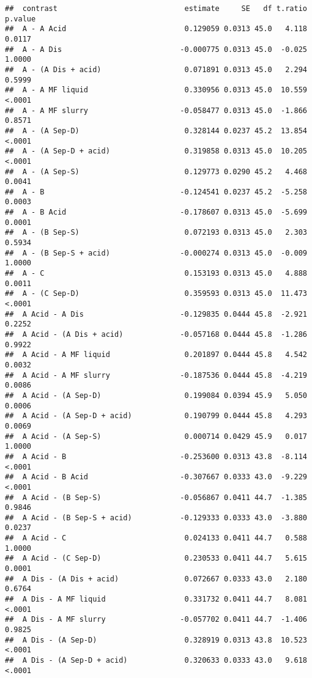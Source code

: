 \documentclass[
]{article}
\begin{document}
\begin{verbatim}
##  contrast                             estimate     SE   df t.ratio p.value
##  A - A Acid                           0.129059 0.0313 45.0   4.118  0.0117
##  A - A Dis                           -0.000775 0.0313 45.0  -0.025  1.0000
##  A - (A Dis + acid)                   0.071891 0.0313 45.0   2.294  0.5999
##  A - A MF liquid                      0.330956 0.0313 45.0  10.559  <.0001
##  A - A MF slurry                     -0.058477 0.0313 45.0  -1.866  0.8571
##  A - (A Sep-D)                        0.328144 0.0237 45.2  13.854  <.0001
##  A - (A Sep-D + acid)                 0.319858 0.0313 45.0  10.205  <.0001
##  A - (A Sep-S)                        0.129773 0.0290 45.2   4.468  0.0041
##  A - B                               -0.124541 0.0237 45.2  -5.258  0.0003
##  A - B Acid                          -0.178607 0.0313 45.0  -5.699  0.0001
##  A - (B Sep-S)                        0.072193 0.0313 45.0   2.303  0.5934
##  A - (B Sep-S + acid)                -0.000274 0.0313 45.0  -0.009  1.0000
##  A - C                                0.153193 0.0313 45.0   4.888  0.0011
##  A - (C Sep-D)                        0.359593 0.0313 45.0  11.473  <.0001
##  A Acid - A Dis                      -0.129835 0.0444 45.8  -2.921  0.2252
##  A Acid - (A Dis + acid)             -0.057168 0.0444 45.8  -1.286  0.9922
##  A Acid - A MF liquid                 0.201897 0.0444 45.8   4.542  0.0032
##  A Acid - A MF slurry                -0.187536 0.0444 45.8  -4.219  0.0086
##  A Acid - (A Sep-D)                   0.199084 0.0394 45.9   5.050  0.0006
##  A Acid - (A Sep-D + acid)            0.190799 0.0444 45.8   4.293  0.0069
##  A Acid - (A Sep-S)                   0.000714 0.0429 45.9   0.017  1.0000
##  A Acid - B                          -0.253600 0.0313 43.8  -8.114  <.0001
##  A Acid - B Acid                     -0.307667 0.0333 43.0  -9.229  <.0001
##  A Acid - (B Sep-S)                  -0.056867 0.0411 44.7  -1.385  0.9846
##  A Acid - (B Sep-S + acid)           -0.129333 0.0333 43.0  -3.880  0.0237
##  A Acid - C                           0.024133 0.0411 44.7   0.588  1.0000
##  A Acid - (C Sep-D)                   0.230533 0.0411 44.7   5.615  0.0001
##  A Dis - (A Dis + acid)               0.072667 0.0333 43.0   2.180  0.6764
##  A Dis - A MF liquid                  0.331732 0.0411 44.7   8.081  <.0001
##  A Dis - A MF slurry                 -0.057702 0.0411 44.7  -1.406  0.9825
##  A Dis - (A Sep-D)                    0.328919 0.0313 43.8  10.523  <.0001
##  A Dis - (A Sep-D + acid)             0.320633 0.0333 43.0   9.618  <.0001

\end{verbatim}
\end{document}
